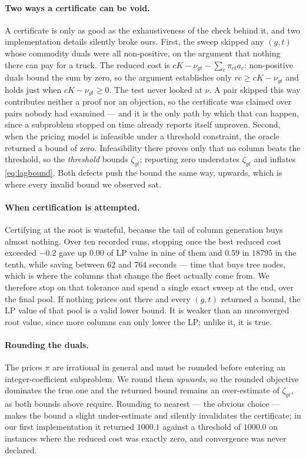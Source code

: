 \paragraph{Two ways a certificate can be void.}
A certificate is only as good as the exhaustiveness of the check
behind it, and two implementation details silently broke ours. First,
the sweep skipped any $(g,t)$ whose commodity duals were all
non-positive, on the argument that nothing there can pay for a
truck. The reduced cost is
$cK-\nu_{gt}-\sum_{c}\pi_{ct}a_{c}$: non-positive duals bound the sum
by zero, so the argument establishes only $rc\ge cK-\nu_{gt}$ and holds
just when $cK-\nu_{gt}\ge 0$. The test never looked at $\nu$. A pair
skipped this way contributes neither a proof nor an objection, so the
certificate was claimed over pairs nobody had examined --- and it is
the only path by which that can happen, since a subproblem stopped on
time already reports itself unproven. Second, when the pricing model
is infeasible under a threshold constraint, the oracle returned a
bound of zero. Infeasibility there proves only that no column beats
the threshold, so the \emph{threshold} bounds $\zeta_{gt}$; reporting
zero understates $\zeta_{gt}$ and inflates \eqref{eq:lagbound}. Both
defects push the bound the same way, upwards, which is where every
invalid bound we observed sat.

\paragraph{When certification is attempted.}
Certifying at the root is wasteful, because the tail of column
generation buys almost nothing. Over ten recorded runs, stopping once
the best reduced cost exceeded $-0.2$ gave up $0.00$ of LP value in
nine of them and $0.59$ in $18795$ in the tenth, while saving between
$62$ and $764$ seconds --- time that buys tree nodes, which is where
the columns that change the fleet actually come from. We therefore
stop on that tolerance and spend a single exact sweep at the end, over
the final pool. If nothing prices out there and every $(g,t)$ returned
a bound, the LP value of that pool is a valid lower bound. It is
weaker than an unconverged root value, since more columns can only
lower the LP; unlike it, it is true.



\paragraph{Rounding the duals.}
The prices $\pi$ are irrational in general and must be rounded before
entering an integer-coefficient subproblem. We round them
\emph{upwards}, so the rounded objective dominates the true one and
the returned bound remains an over-estimate of $\zeta_{gt}$, as both
bounds above require. Rounding to nearest --- the obvious choice ---
makes the bound a slight under-estimate and silently invalidates the
certificate; in our first implementation it returned $1000.1$ against
a threshold of $1000.0$ on instances where the reduced cost was
exactly zero, and convergence was never declared.


